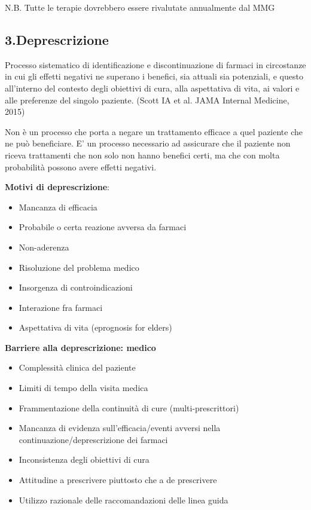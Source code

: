   N.B. Tutte le terapie dovrebbero essere rivalutate annualmente dal MMG

  \subsection{3.Deprescrizione}
  
  Processo sistematico di identificazione e discontinuazione di farmaci
  in circostanze in cui gli effetti negativi ne superano i benefici, sia
  attuali sia potenziali, e questo all'interno del contesto degli
  obiettivi di cura, alla aspettativa di vita, ai valori e alle
  preferenze del singolo paziente. (Scott IA et al. JAMA Internal
  Medicine, 2015)

  Non è un processo che porta a negare un trattamento efficace a quel
  paziente che ne può beneficiare. E' un processo necessario ad
  assicurare che il paziente non riceva trattamenti che non solo non
  hanno benefici certi, ma che con molta probabilità possono avere
  effetti negativi.

  \textbf{Motivi di deprescrizione}:

\begin{itemize}
\item
  Mancanza di efficacia
\item
  Probabile o certa reazione avversa da farmaci
\item
  Non-aderenza
\item
  Risoluzione del problema medico
\item
  Insorgenza di controindicazioni
\item
  Interazione fra farmaci
\item
  Aspettativa di vita (eprognosis for elders)
\end{itemize}

  \textbf{Barriere alla deprescrizione: medico}

\begin{itemize}
\item
  Complessità clinica del paziente
\item
  Limiti di tempo della visita medica
\item
  Frammentazione della continuità di cure (multi-prescrittori)
\item
  Mancanza di evidenza sull'efficacia/eventi avversi nella
  continuazione/deprescrizione dei farmaci
\item
  Inconsistenza degli obiettivi di cura
\item
  Attitudine a prescrivere piuttosto che a de prescrivere
\item
  Utilizzo razionale delle raccomandazioni delle linea guida
\end{itemize}
  
